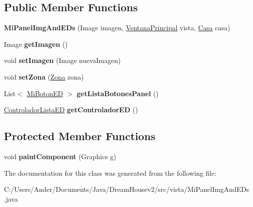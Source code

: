 \subsection*{Public Member Functions}
\begin{DoxyCompactItemize}
\item 
\mbox{\label{classvista_1_1_mi_panel_img_and_e_ds_a9a05707bd842a8c78a8b0c188f342ebc}} 
{\bfseries Mi\+Panel\+Img\+And\+E\+Ds} (Image imagen, \mbox{\hyperlink{classvista_1_1_ventana_principal}{Ventana\+Principal}} vista, \mbox{\hyperlink{classmodelo_1_1_casa}{Casa}} casa)
\item 
\mbox{\label{classvista_1_1_mi_panel_img_and_e_ds_ad6fe7d3e2ceb875550c2933a2fb4a03b}} 
Image {\bfseries get\+Imagen} ()
\item 
\mbox{\label{classvista_1_1_mi_panel_img_and_e_ds_a25e4fda0b1fd6e037498c3478478018a}} 
void {\bfseries set\+Imagen} (Image nueva\+Imagen)
\item 
\mbox{\label{classvista_1_1_mi_panel_img_and_e_ds_a4b474e495661a6c188a2ea5aceabab61}} 
void {\bfseries set\+Zona} (\mbox{\hyperlink{classmodelo_1_1_zona}{Zona}} zona)
\item 
\mbox{\label{classvista_1_1_mi_panel_img_and_e_ds_af761a5a5e1f4ba64e828bdfbda12f20d}} 
List$<$ \mbox{\hyperlink{classvista_1_1_mi_boton_e_d}{Mi\+Boton\+ED}} $>$ {\bfseries get\+Lista\+Botones\+Panel} ()
\item 
\mbox{\label{classvista_1_1_mi_panel_img_and_e_ds_a6a3da428a1236e42368d53842486ff3f}} 
\mbox{\hyperlink{classcontrolador_1_1_controlador_lista_e_d}{Controlador\+Lista\+ED}} {\bfseries get\+Controlador\+ED} ()
\end{DoxyCompactItemize}
\subsection*{Protected Member Functions}
\begin{DoxyCompactItemize}
\item 
\mbox{\label{classvista_1_1_mi_panel_img_and_e_ds_abb385fe3b946590d52a1a7373e1fdda5}} 
void {\bfseries paint\+Component} (Graphics g)
\end{DoxyCompactItemize}


The documentation for this class was generated from the following file\+:\begin{DoxyCompactItemize}
\item 
C\+:/\+Users/\+Ander/\+Documents/\+Java/\+Dream\+Housev2/src/vista/Mi\+Panel\+Img\+And\+E\+Ds.\+java\end{DoxyCompactItemize}
